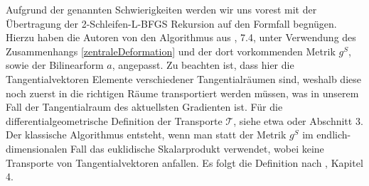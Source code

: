 Aufgrund der genannten Schwierigkeiten werden wir uns vorest mit der Übertragung der 2-Schleifen-L-BFGS Rekursion auf den Formfall begnügen. Hierzu haben die Autoren von \cite{bfgs1} den Algorithmus aus \cite{Nocedal}, 7.4, unter Verwendung des Zusammenhangs \ref{zentraleDeformation} und der dort vorkommenden Metrik $g^S$, sowie der Bilinearform $a$, angepasst. Zu beachten ist, dass hier die Tangentialvektoren Elemente verschiedener Tangentialräumen sind, weshalb diese noch zuerst in die richtigen Räume transportiert werden müssen, was in unserem Fall der Tangentialraum des aktuellsten Gradienten ist. Für die differentialgeometrische Definition der Transporte $\mathcal{T}$, siehe etwa \cite{LeeDGEO} oder \cite{diffusion} Abschnitt 3. Der klassische Algorithmus entsteht, wenn man statt der Metrik $g^S$ im endlich-dimensionalen Fall das euklidische Skalarprodukt verwendet, wobei keine Transporte von Tangentialvektoren anfallen. Es folgt die Definition nach \cite{bfgs1}, Kapitel 4.

